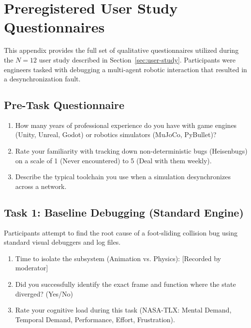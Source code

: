 \documentclass[sigconf,nonacm]{acmart}
\begin{document}
\section{Preregistered User Study Questionnaires}
This appendix provides the full set of qualitative questionnaires utilized during the $N=12$ user study described in Section~\ref{sec:user-study}. Participants were engineers tasked with debugging a multi-agent robotic interaction that resulted in a desynchronization fault. 

\subsection{Pre-Task Questionnaire}
\begin{enumerate}
    \item How many years of professional experience do you have with game engines (Unity, Unreal, Godot) or robotics simulators (MuJoCo, PyBullet)?
    \item Rate your familiarity with tracking down non-deterministic bugs (Heisenbugs) on a scale of 1 (Never encountered) to 5 (Deal with them weekly).
    \item Describe the typical toolchain you use when a simulation desynchronizes across a network.
\end{enumerate}

\subsection{Task 1: Baseline Debugging (Standard Engine)}
Participants attempt to find the root cause of a foot-sliding collision bug using standard visual debuggers and log files.
\begin{enumerate}
    \item Time to isolate the subsystem (Animation vs. Physics): [Recorded by moderator]
    \item Did you successfully identify the exact frame and function where the state diverged? (Yes/No)
    \item Rate your cognitive load during this task (NASA-TLX: Mental Demand, Temporal Demand, Performance, Effort, Frustration).
\end{enumerate}
\end{document}
